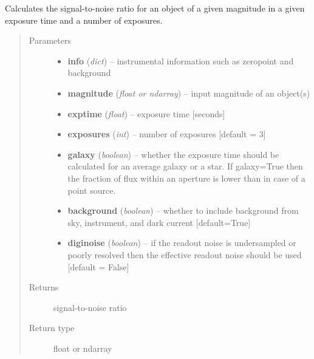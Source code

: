 \documentclass[a4paper,11pt,english]{sphinxmanual}
\begin{document}
\begin{fulllineitems}
\label{ETC:ETC.ETC.SNR}
Calculates the signal-to-noise ratio for an object of a given magnitude in a given exposure time and a
number of exposures.
\begin{quote}\begin{description}
\item[{Parameters}] \leavevmode\begin{itemize}
\item {} 
\textbf{info} (\emph{dict}) -- instrumental information such as zeropoint and background

\item {} 
\textbf{magnitude} (\emph{float or ndarray}) -- input magnitude of an object(s)

\item {} 
\textbf{exptime} (\emph{float}) -- exposure time {[}seconds{]}

\item {} 
\textbf{exposures} (\emph{int}) -- number of exposures {[}default = 3{]}

\item {} 
\textbf{galaxy} (\emph{boolean}) -- whether the exposure time should be calculated for an average galaxy or a star.
If galaxy=True then the fraction of flux within an aperture is lower than in case of a point source.

\item {} 
\textbf{background} (\emph{boolean}) -- whether to include background from sky, instrument, and dark current {[}default=True{]}

\item {} 
\textbf{diginoise} (\emph{boolean}) -- if the readout noise is undersampled or poorly resolved then the effective readout noise
should be used {[}default = False{]}

\end{itemize}

\item[{Returns}] \leavevmode
signal-to-noise ratio

\item[{Return type}] \leavevmode
float or ndarray

\end{description}\end{quote}

\end{fulllineitems}
\end{document}
